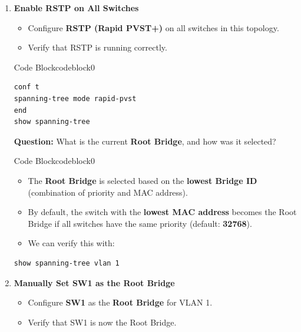 \documentclass[a4paper]{book}
\begin{document}
\begin{enumerate}
	\item \textbf{Enable RSTP on All Switches}
	      \begin{itemize}
		      \item Configure \textbf{RSTP (Rapid PVST+)} on all switches in this topology.
		      \item Verify that RSTP is running correctly.
	      \end{itemize}


	      \begin{ocg}{Code Block}{codeblock}{0}
		      \vspace{0.5cm}
		      \begin{lstlisting}
conf t
spanning-tree mode rapid-pvst
end
show spanning-tree
                    \end{lstlisting}
	      \end{ocg}


	      \textbf{Question:} What is the current \textbf{Root Bridge}, and how was it selected?




	      \begin{ocg}{Code Block}{codeblock}{0}
		      \vspace{0.5cm}
		      \begin{itemize}
			      \item The \textbf{Root Bridge} is selected based on the \textbf{lowest Bridge ID} (combination of priority and MAC address).
			      \item By default, the switch with the \textbf{lowest MAC address} becomes the Root Bridge if all switches have the same priority (default: \textbf{32768}).
			      \item We can verify this with:
		      \end{itemize}
		      \begin{lstlisting}
show spanning-tree vlan 1
              \end{lstlisting}
	      \end{ocg}

	\item \textbf{Manually Set SW1 as the Root Bridge}
	      \begin{itemize}
		      \item Configure \textbf{SW1} as the \textbf{Root Bridge} for VLAN 1.
		      \item Verify that SW1 is now the Root Bridge.
	      \end{itemize}


\end{enumerate}
\end{document}
